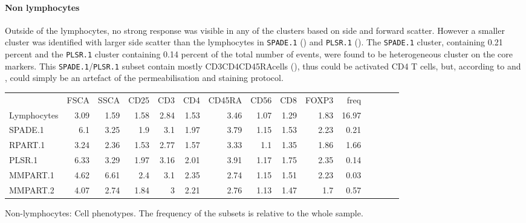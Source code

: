 \paragraph{Non lymphocytes}
Outside of the lymphocytes, no strong response was visible in any of the clusters based on side and forward scatter.
However a smaller cluster was identified with larger side scatter than the lymphocytes in \texttt{SPADE.1} () and \texttt{PLSR.1} ().
The \texttt{SPADE.1} cluster, containing 0.21 percent and the \texttt{PLSR.1} cluster containing 0.14 percent of the total number of events, were found to be heterogeneous cluster on the core markers.
This \texttt{SPADE.1}/\texttt{PLSR.1} subset contain mostly CD3\positive CD4\positive CD45RA\positive cells (), thus could be activated CD4 T cells, but, according to  and , could simply be an artefact of the permeabilisation and staining protocol.


\begin{table}[h]\footnotesize
\centering
\begin{tabular}{lrrrrrrrrrrrrrr}
\rowcolor{Gray} 
            & FSCA & SSCA & CD25 & CD3  & CD4  & CD45RA & CD56 & CD8  & FOXP3 & freq \\
Lymphocytes & 3.09 & 1.59 & 1.58 & 2.84 & 1.53 & 3.46   & 1.07 & 1.29 & 1.83  & 16.97 \\
SPADE.1     & 6.1  & 3.25 & 1.9  & 3.1  & 1.97 & 3.79   & 1.15 & 1.53 & 2.23  & 0.21 \\
RPART.1     & 3.24 & 2.36 & 1.53 & 2.77 & 1.57 & 3.33   & 1.1  & 1.35 & 1.86  & 1.66 \\
PLSR.1      & 6.33 & 3.29 & 1.97 & 3.16 & 2.01 & 3.91   & 1.17 & 1.75 & 2.35  & 0.14 \\
MMPART.1    & 4.62 & 6.61 & 2.4  & 3.1  & 2.35 & 2.74   & 1.15 & 1.51 & 2.23  & 0.03 \\
MMPART.2    & 4.07 & 2.74 & 1.84 & 3    & 2.21 & 2.76   & 1.13 & 1.47 & 1.7   & 0.57 \\
\end{tabular}
{ Non-lymphocytes: Cell phenotypes. }
{ The frequency of the subsets is relative to the whole sample. }
\end{table}


